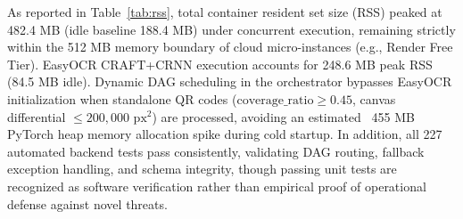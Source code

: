 \documentclass[conference]{IEEEtran}
\begin{document}
\begin{table}[htbp]
\caption{Operational Fallback Continuity Latency and Precision-Recall Trade-Off}
\label{tab:fallback_speedup}
\centering
{}
\end{table}

As reported in Table~\ref{tab:rss}, total container resident set size (RSS) peaked at 482.4 MB (idle baseline 188.4 MB) under concurrent execution, remaining strictly within the 512 MB memory boundary of cloud micro-instances (e.g., Render Free Tier). EasyOCR CRAFT+CRNN execution accounts for 248.6 MB peak RSS (84.5 MB idle). Dynamic DAG scheduling in the orchestrator bypasses EasyOCR initialization when standalone QR codes ($\text{coverage\_ratio} \ge 0.45$, canvas differential $\le 200,000\text{ px}^2$) are processed, avoiding an estimated ~455 MB PyTorch heap memory allocation spike during cold startup. In addition, all 227 automated backend tests pass consistently, validating DAG routing, fallback exception handling, and schema integrity, though passing unit tests are recognized as software verification rather than empirical proof of operational defense against novel threats.
\end{document}
